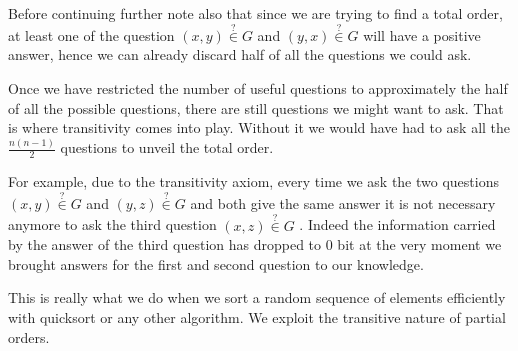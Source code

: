 Before continuing further note also that since we are trying to find a total order, at least one of the question $(x, y) \stackrel{?}{\in} G$ and $(y, x) \stackrel{?}{\in} G$ will have a positive answer, hence we can already discard half of all the questions we could ask.

Once we have restricted the number of useful questions to approximately the half of all the possible questions, there are still  questions we might want to ask. That is where transitivity comes into play. Without it we would have had to ask all the $\frac{n (n-1)}{2}$ questions to unveil the total order.

For example, due to the transitivity axiom, every time we ask the two questions $(x, y) \stackrel{?}{\in} G$ and $(y, z) \stackrel{?}{\in} G$ and both give the same answer it is not necessary anymore to ask the third question $(x, z) \stackrel{?}{\in} G$ . Indeed the information carried by the answer of the third question has dropped to 0 bit at the very moment we brought answers for the first and second question to our knowledge.

This is really what we do when we sort a random sequence of elements efficiently with quicksort or any other  algorithm. We exploit the transitive nature of partial orders.